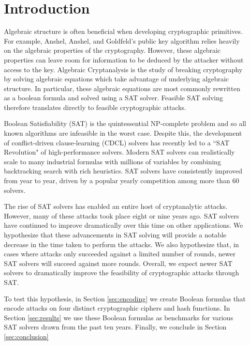 \section{Introduction}

Algebraic structure is often beneficial when developing cryptographic primitives. For example, Anshel, Anshel, and Goldfeld's public key algorithm \cite{AAG99} relies heavily on the algebraic properties of the cryptography. However, these algebraic properties can leave room for information to be deduced by the attacker without access to the key. Algebraic Cryptanalysis \cite{Bard09} is the study of breaking cryptography by solving algebraic equations which take advantage of underlying algebraic structure. In particular, these algebraic equations are most commonly rewritten as a boolean formula and solved using a SAT solver. Feasible SAT solving therefore translates directly to feasible cryptographic attacks.

Boolean Satisfiability (SAT) is the quintessential NP-complete problem and so all known algorithms are infeasible in the worst case. Despite this, the development of conflict-driven clause-learning (CDCL) solvers has recently led to a ``SAT Revolution" of high-performance solvers. \cite{BHMW09} Modern SAT solvers can realistically scale to many industrial formulas with millions of variables by combining backtracking search with rich heuristics. \cite{MZ09} SAT solvers have consistently improved from year to year, driven by a popular yearly competition among more than 60 solvers. \cite{JLRS12}

The rise of SAT solvers has enabled an entire host of cryptanalytic attacks. However, many of these attacks took place  \cite{CB07,CNO08,DKV07,MCP07,MZ06} eight or nine years ago. SAT solvers have continued to improve dramatically over this time on other applications. We hypothesize that these advancements in SAT solving will provide a notable decrease in the time taken to perform the attacks. We also hypothesize that, in cases where attacks only succeeded against a limited number of rounds, newer SAT solvers will succeed against more rounds. Overall, we expect newer SAT solvers to dramatically improve the feasibility of cryptographic attacks through SAT.

To test this hypothesis, in Section \ref{sec:encoding} we create Boolean formulas that encode attacks on four distinct cryptographic ciphers and hash functions. In Section \ref{sec:results} we use these Boolean formulas as benchmarks for various SAT solvers drawn from the past ten years. Finally, we conclude in Section \ref{sec:conclusion}
